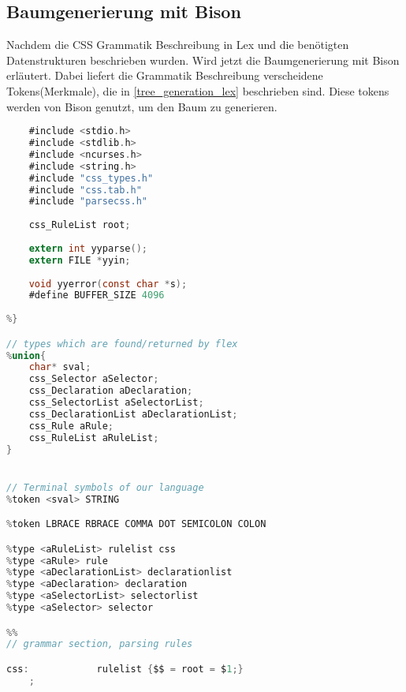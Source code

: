 \subsection{Baumgenerierung mit Bison}
Nachdem die CSS Grammatik Beschreibung in Lex und die benötigten Datenstrukturen beschrieben wurden. Wird jetzt die Baumgenerierung mit Bison erläutert. Dabei liefert die Grammatik Beschreibung verscheidene Tokens(Merkmale), die in \ref{tree_generation_lex} beschrieben sind. Diese tokens werden von Bison genutzt, um den Baum zu generieren. 
\begin{lstlisting}[label=css_bison,language=C, caption=Baumgenerierung mit Bison]
%{
    #include <stdio.h>
    #include <stdlib.h>
    #include <ncurses.h>
    #include <string.h>
    #include "css_types.h"
    #include "css.tab.h"
    #include "parsecss.h"
        
    css_RuleList root; 
	
    extern int yyparse();
    extern FILE *yyin;
    
    void yyerror(const char *s);
	#define BUFFER_SIZE 4096
	
%}

// types which are found/returned by flex 
%union{
    char* sval;
    css_Selector aSelector;
    css_Declaration aDeclaration;
    css_SelectorList aSelectorList;
    css_DeclarationList aDeclarationList;
    css_Rule aRule;
    css_RuleList aRuleList;
}


// Terminal symbols of our language
%token <sval> STRING

%token LBRACE RBRACE COMMA DOT SEMICOLON COLON

%type <aRuleList> rulelist css
%type <aRule> rule
%type <aDeclarationList> declarationlist
%type <aDeclaration> declaration
%type <aSelectorList> selectorlist
%type <aSelector> selector

%%
// grammar section, parsing rules

css:			rulelist {$$ = root = $1;}
	;


\end{lstlisting}
